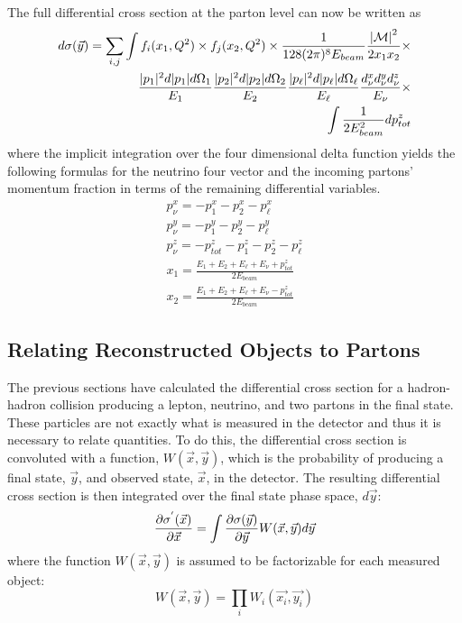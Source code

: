 The full differential cross section at the parton level can now be
written as
\begin{eqnarray}
\nonumber
d\sigma(\vec{y}) = \sum_{i,j} \int f_{i}(x_{1}, Q^{2})
\times 
f_{j}(x_{2}, Q^{2}) \times \frac{1}{128(2\pi)^{8}E_{beam}}
\frac{{|\cal M|}^{2}}{2x_{1}x_{2}} \times \\
\nonumber
\frac{|p_{1}|^{2}d|p_{1}|d\Omega_{1}}{E_{1}}
\frac{|p_{2}|^{2}d|p_{2}|d\Omega_{2}}{E_{2}}
\frac{|p_{\ell}|^{2}d|p_{\ell}|d\Omega_{\ell}}{E_{\ell}}
\frac{d^{x}_{\nu} d^{y}_{\nu} d^{z}_{\nu}}{E_{\nu}} \times \\
\int \frac{1}{2E^{2}_{beam}} dp^{z}_{tot}
\end{eqnarray}
\noindent where the implicit integration over the four dimensional
delta function yields the following formulas for the neutrino four
vector and the incoming partons' momentum fraction in terms of the
remaining differential variables.
\begin{eqnarray}
p^{x}_{\nu} = - p^{x}_{1} - p^{x}_{2} - p^{x}_{\ell} \\
p^{y}_{\nu} = - p^{y}_{1} - p^{y}_{2} - p^{y}_{\ell} \\
p^{z}_{\nu} = - p^{z}_{tot} - p^{z}_{1} - p^{z}_{2} - p^{z}_{\ell} \\
x_{1} = \frac{E_{1} + E_{2} + E_{\ell} + E_{\nu} + p^{z}_{tot}}
{2E_{beam}} \\
x_{2} = \frac{E_{1} + E_{2} + E_{\ell} + E_{\nu} - p^{z}_{tot}}
{2E_{beam}}
\end{eqnarray}


\subsection{Relating Reconstructed Objects to Partons}

The previous sections have calculated the differential cross section
for a hadron-hadron collision producing a lepton, neutrino, and two
partons in the final state. These particles are not exactly what is
measured in the detector and thus it is necessary to relate
quantities. To do this, the differential cross section is convoluted
with a function, $W(\vec{x}, \vec{y})$, which is the probability of
producing a final state, $\vec{y}$, and observed state, $\vec{x}$, in
the detector. The resulting differential cross section is then
integrated over the final state phase space, $d\vec{y}$:
\begin{equation}
\frac{\partial \sigma^{'}(\vec{x})}{\partial \vec{x}} =
\int \frac{\partial \sigma(\vec{y})}{\partial \vec{y}} W(\vec{x}, \vec{y}) d\vec{y}
\end{equation}
\noindent where the function $W(\vec{x}, \vec{y})$ is assumed to be
factorizable for each measured object:
\begin{equation}
W(\vec{x}, \vec{y}) = \prod_{i} W_{i}(\vec{x_{i}}, \vec{y_{i}})
\end{equation}


